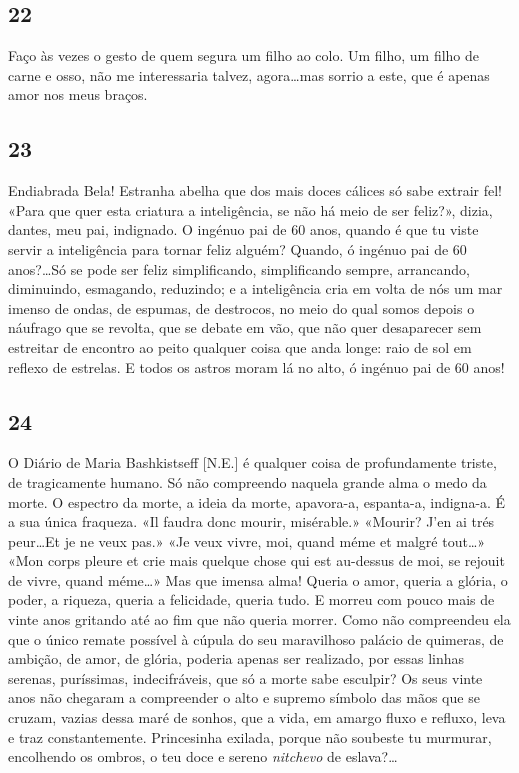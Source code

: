 \subsection{22} 

Faço às vezes o gesto de quem segura um filho
ao colo. Um filho, um filho de carne e osso, não me
interessaria talvez, agora\ldots mas sorrio a este, que é
apenas amor nos meus braços.

\subsection{23} 

Endiabrada Bela! Estranha abelha que dos mais
doces cálices só sabe extrair fel! «Para que quer
esta criatura a inteligência, se não há meio de ser
feliz?», dizia, dantes, meu pai, indignado. O 
ingénuo pai de 60 anos, quando é que tu viste servir a
inteligência para tornar feliz alguém? Quando,
ó ingénuo pai de 60 anos?\ldots Só se pode ser feliz
simplificando, simplificando sempre, arrancando, 
diminuindo, esmagando, reduzindo; e a inteligência cria
em volta de nós um mar imenso de ondas, de espumas,
de destrocos, no meio do qual somos depois o 
náufrago que se revolta, que se debate em vão, que não
quer desaparecer sem estreitar de encontro ao peito
qualquer coisa que anda longe: raio de sol em reflexo
de estrelas. E todos os astros moram lá no alto, ó
ingénuo pai de 60 anos!

\subsection{24} 

O Diário de Maria Bashkistseff [N.E.] é qualquer coisa
de profundamente triste, de tragicamente humano. Só
não compreendo naquela grande alma o medo da
morte. O espectro da morte, a ideia da morte, 
apavora-a, espanta-a, indigna-a. É a sua única fraqueza.
«Il faudra donc mourir, misérable.» «Mourir? J’en ai
trés peur\ldots Et je ne veux pas.» «Je veux vivre, moi,
quand méme et malgré tout\ldots» «Mon corps pleure et
crie mais quelque chose qui est au-dessus de moi, se
rejouit de vivre, quand méme\ldots» Mas que imensa
alma! Queria o amor, queria a glória, o poder, a
riqueza, queria a felicidade, queria tudo. E morreu com
pouco mais de vinte anos gritando até ao fim que
não queria morrer. Como não compreendeu ela que o
único remate possível à cúpula do seu maravilhoso
palácio de quimeras, de ambição, de amor, de glória,
poderia apenas ser realizado, por essas linhas serenas,
puríssimas, indecifráveis, que só a morte sabe 
esculpir? Os seus vinte anos não chegaram a compreender
o alto e supremo símbolo das mãos que se cruzam,
vazias dessa maré de sonhos, que a vida, em amargo
fluxo e refluxo, leva e traz constantemente. 
Princesinha exilada, porque não soubeste tu murmurar, 
encolhendo os ombros, o teu doce e sereno \textit{nitchevo}
de eslava?\ldots

